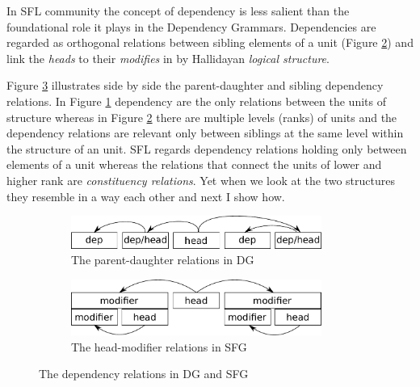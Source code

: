 
In SFL community the concept of dependency is less salient than the foundational role it plays in the Dependency Grammars. Dependencies are regarded as orthogonal relations between sibling elements of a unit (Figure \ref{fig:dependecy-sfg}) and link the \textit{heads} to their \textit{modifies} in by Hallidayan \textit{logical structure}\citep{Halliday2013}. 


Figure \ref{fig:dependency-relations} illustrates side by side the parent-daughter and sibling dependency relations. In Figure \ref{fig:dependecy-dg} dependency are the only relations between the units of structure whereas in Figure \ref{fig:dependecy-sfg} there are multiple levels (ranks) of units and the dependency relations are relevant only between siblings at the same level within the structure of an unit. SFL regards dependency relations holding only between elements of a unit whereas the relations that connect the units of lower and higher rank are \textit{constituency relations}. Yet when we look at the two structures they resemble in a way each other and next I show how. 

\begin{figure}[hbtp]
	\centering
	\begin{subfigure}{.5\textwidth}
		\centering
		\includegraphics[width=0.9\textwidth]{Figures/SFL-grammar/dependency-dg.pdf}
		\vspace{+22pt}
		\caption{The parent-daughter relations in DG}
		\label{fig:dependecy-dg}
	\end{subfigure}%
	\begin{subfigure}{.5\textwidth}
		\centering
		\includegraphics[width=0.9\textwidth]{Figures/SFL-grammar/dependency-sfg.pdf}
		\caption{The head-modifier relations in SFG}
		\label{fig:dependecy-sfg}
	\end{subfigure}
	\caption{The dependency relations in DG and SFG}
	\label{fig:dependency-relations}
\end{figure}

